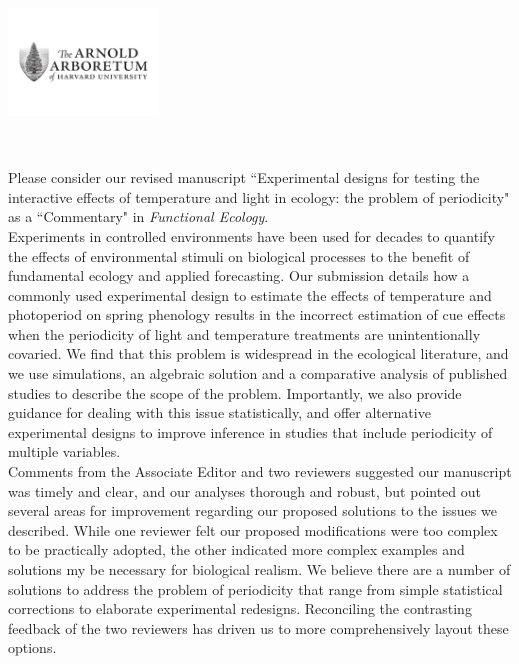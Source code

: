 \documentclass[11 pt]{article}
\begin{document}

\def\labelitemi{--}
\parindent=24pt
\noindent\includegraphics[width=0.3\textwidth]{AA_logo.jpg}

\\
\vspace{1.5ex}

\noindent Please consider our revised manuscript ``Experimental designs for testing the interactive effects of temperature and light in ecology: the problem of periodicity" as a ``Commentary" in \textit{Functional Ecology}.\\

\noindent Experiments in controlled environments have been used for decades to quantify the effects of environmental stimuli on biological processes to the benefit of fundamental ecology and applied forecasting. %
Our submission details how a commonly used experimental design to estimate the effects of temperature and photoperiod on spring phenology results in the incorrect estimation of cue effects when the periodicity of light and temperature treatments are unintentionally covaried. We find that this problem is widespread in the ecological literature, and we use simulations, an algebraic solution and a comparative analysis of published studies to describe the scope of the problem. Importantly, we also provide guidance for dealing with this issue statistically, and offer alternative experimental designs to improve inference in studies that include periodicity of multiple variables.\\

\noindent Comments from the Associate Editor and two reviewers suggested our manuscript was timely and clear, and our analyses thorough and robust, but pointed out several areas for improvement regarding our proposed solutions to the issues we described.
While one reviewer felt our proposed modifications were too complex to be practically adopted, the other indicated more complex examples and solutions my be necessary for biological realism. %
We believe there are a number of solutions to address the problem of periodicity that range from simple statistical corrections to elaborate experimental redesigns. Reconciling the contrasting feedback of the two reviewers has driven us to more comprehensively layout these options.\\%
\end{document}
